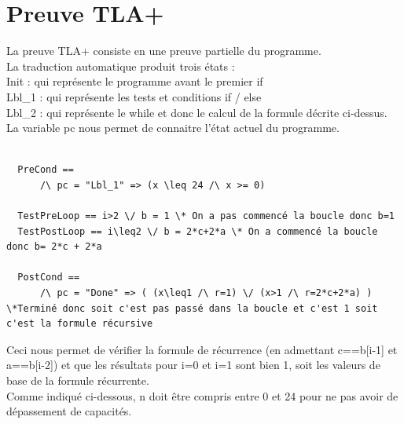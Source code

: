 \documentclass{scrreprt}
\begin{document}
\section{Preuve TLA+}
La preuve TLA+ consiste en une preuve partielle du programme.\\
La traduction automatique produit trois états :\\
Init : qui représente le programme avant le premier if\\
Lbl_1 : qui représente les tests et conditions if / else\\
Lbl_2 : qui représente le while et donc le calcul de la formule décrite ci-dessus.\\
La variable pc nous permet de connaitre l'état actuel du programme.\\
\\
\begin{lstlisting}
  PreCond ==
      /\ pc = "Lbl_1" => (x \leq 24 /\ x >= 0)

  TestPreLoop == i>2 \/ b = 1 \* On a pas commencé la boucle donc b=1
  TestPostLoop == i\leq2 \/ b = 2*c+2*a \* On a commencé la boucle donc b= 2*c + 2*a

  PostCond ==
      /\ pc = "Done" => ( (x\leq1 /\ r=1) \/ (x>1 /\ r=2*c+2*a) ) \*Terminé donc soit c'est pas passé dans la boucle et c'est 1 soit c'est la formule récursive
\end{lstlisting}

Ceci nous permet de vérifier la formule de récurrence (en admettant c==b[i-1] et a==b[i-2]) et que les résultats pour i=0 et i=1 sont bien 1, soit les valeurs de base de la formule récurrente.
\\
Comme indiqué ci-dessous, n doit être compris entre 0 et 24 pour ne pas avoir de dépassement de capacités.
\end{document}
